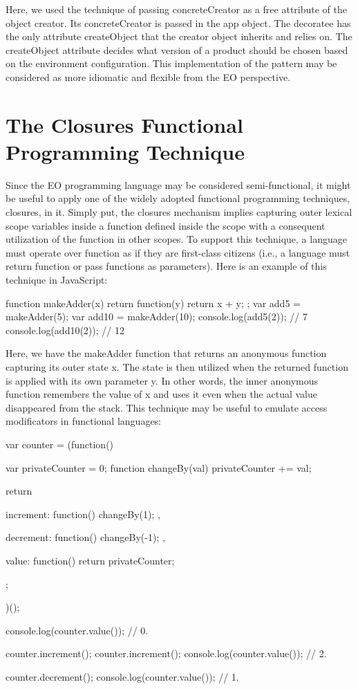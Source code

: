 \documentclass[12pt]{book}
\begin{document}
Here, we used the technique of passing concreteCreator as a free attribute of the object creator. Its concreteCreator is passed in the app object. The decoratee has the only attribute createObject that the creator object inherits and relies on. The createObject attribute decides what version of a product should be chosen based on the environment configuration. This implementation of the pattern may be considered as more idiomatic and flexible from the EO perspective.


\section{The Closures Functional Programming Technique}
Since the EO programming language may be considered semi-functional, it might be useful to apply one of the widely adopted functional programming techniques, closures, in it. Simply put, the closures mechanism implies capturing outer lexical scope variables inside a function defined inside the scope with a consequent utilization of the function in other scopes. To support this technique, a language must operate over function as if they are first-class citizens (i.e., a language must return function or pass functions as parameters). Here is an example of this technique in JavaScript:

\begin{ffcode}
function makeAdder(x) {
  return function(y) {
    return x + y;
  };
}
var add5 = makeAdder(5);
var add10 = makeAdder(10);
console.log(add5(2));  // 7
console.log(add10(2)); // 12
\end{ffcode}

Here, we have the makeAdder function that returns an anonymous function capturing its outer state x. The state is then utilized when the returned function is applied with its own parameter y. In other words, the inner anonymous function remembers the value of x and uses it even when the actual value disappeared from the stack. This technique may be useful to emulate access modificators in functional languages: 

\begin{ffcode}
var counter = (function() {
  var privateCounter = 0;
  function changeBy(val) {
    privateCounter += val;
  }

  return {
    increment: function() {
      changeBy(1);
    },

    decrement: function() {
      changeBy(-1);
    },

    value: function() {
      return privateCounter;
    }
  };
})();

console.log(counter.value());  // 0.

counter.increment();
counter.increment();
console.log(counter.value());  // 2.

counter.decrement();
console.log(counter.value());  // 1.
\end{ffcode}
\end{document}
